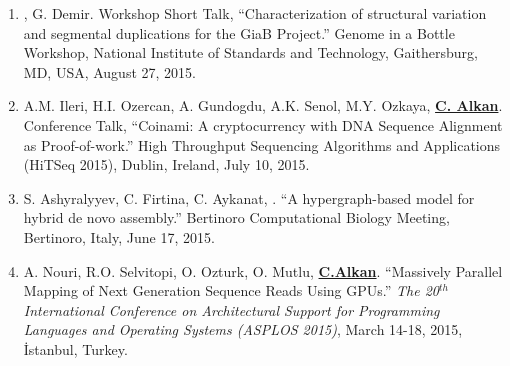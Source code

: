 
\begin{enumerate}
\item
  \calkan{}, G. Demir. Workshop Short Talk, 
         ``Characterization of structural variation and segmental duplications for the GiaB Project.''
         Genome in a Bottle Workshop, National Institute of Standards and Technology, Gaithersburg, MD, USA,
         August 27, 2015.
\item
  A.M. Ileri, H.I. Ozercan, A. Gundogdu, A.K. Senol, M.Y. Ozkaya, {\bf {\underline{C. Alkan}}}. Conference Talk, 
  ``Coinami: A cryptocurrency with DNA Sequence Alignment as Proof-of-work.''
  High Throughput Sequencing Algorithms and Applications (HiTSeq 2015), Dublin, Ireland, July 10, 2015.

\item
  S. Ashyralyyev, C. Firtina, C. Aykanat, \calkan{}.
  ``A hypergraph-based model for hybrid de novo assembly.''
  Bertinoro Computational Biology Meeting, Bertinoro, Italy, June 17, 2015.
\item
  A. Nouri, R.O. Selvitopi, O. Ozturk, O. Mutlu, {\bf {\underline{C.Alkan}}}. ``Massively Parallel Mapping of Next Generation Sequence Reads Using GPUs.''
{\em The 20$^{th}$ International Conference on Architectural Support for Programming Languages and Operating Systems (ASPLOS 2015)}, 
March 14-18, 2015, İstanbul, Turkey. 

\end{enumerate}
